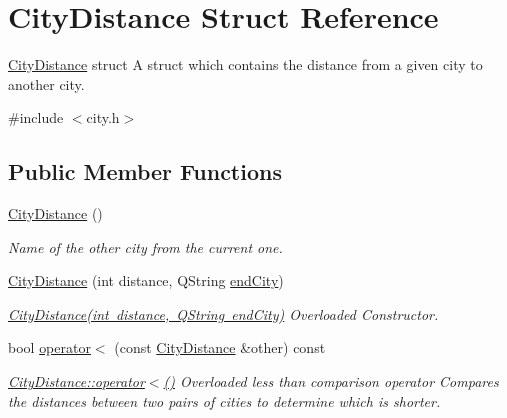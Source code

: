 \hypertarget{struct_city_distance}{}\section{City\+Distance Struct Reference}
\label{struct_city_distance}


\mbox{\hyperlink{struct_city_distance}{City\+Distance}} struct A struct which contains the distance from a given city to another city.  




{\ttfamily \#include $<$city.\+h$>$}

\subsection*{Public Member Functions}
\begin{DoxyCompactItemize}
\item 
\mbox{\hyperlink{struct_city_distance_aa486f287fb876e7aec9d41340a9a2b62}{City\+Distance}} ()
\begin{DoxyCompactList}\small\item\em Name of the other city from the current one. \end{DoxyCompactList}\item 
\mbox{\label{struct_city_distance_a5710d1d7374892efd201c4cd187d9e42}} 
\mbox{\hyperlink{struct_city_distance_a5710d1d7374892efd201c4cd187d9e42}{City\+Distance}} (int distance, Q\+String \mbox{\hyperlink{struct_city_distance_a7f1fe8d0c76af2abf5bc5c6bd1800e7f}{end\+City}})
\begin{DoxyCompactList}\small\item\em \mbox{\hyperlink{struct_city_distance_a5710d1d7374892efd201c4cd187d9e42}{City\+Distance(int distance, Q\+String end\+City)}} Overloaded Constructor. \end{DoxyCompactList}\item 
\mbox{\label{struct_city_distance_a6195d187d1f0309e67ee62b3a5b56b86}} 
bool \mbox{\hyperlink{struct_city_distance_a6195d187d1f0309e67ee62b3a5b56b86}{operator$<$}} (const \mbox{\hyperlink{struct_city_distance}{City\+Distance}} \&other) const
\begin{DoxyCompactList}\small\item\em \mbox{\hyperlink{struct_city_distance_a6195d187d1f0309e67ee62b3a5b56b86}{City\+Distance\+::operator$<$()}} Overloaded less than comparison operator Compares the distances between two pairs of cities to determine which is shorter. \end{DoxyCompactList}\item 

\end{DoxyCompactItemize}
